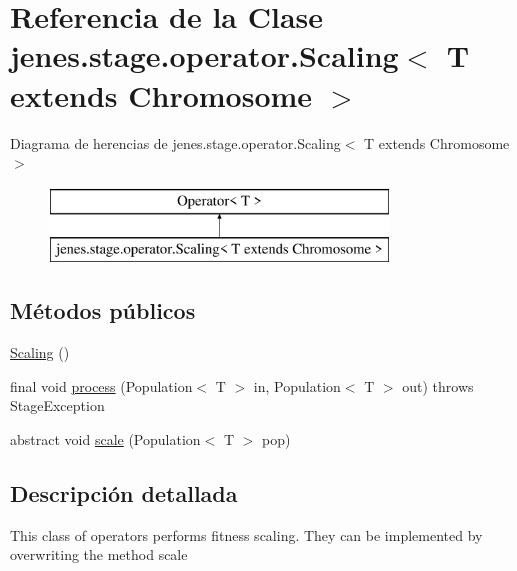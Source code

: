 \hypertarget{classjenes_1_1stage_1_1operator_1_1_scaling_3_01_t_01extends_01_chromosome_01_4}{\section{Referencia de la Clase jenes.\-stage.\-operator.\-Scaling$<$ T extends Chromosome $>$}
\label{classjenes_1_1stage_1_1operator_1_1_scaling_3_01_t_01extends_01_chromosome_01_4}
}
Diagrama de herencias de jenes.\-stage.\-operator.\-Scaling$<$ T extends Chromosome $>$\begin{figure}[H]
\begin{center}
\leavevmode
\includegraphics[height=2.000000cm]{classjenes_1_1stage_1_1operator_1_1_scaling_3_01_t_01extends_01_chromosome_01_4}
\end{center}
\end{figure}
\subsection*{Métodos públicos}
\begin{DoxyCompactItemize}
\item 
\hyperlink{classjenes_1_1stage_1_1operator_1_1_scaling_3_01_t_01extends_01_chromosome_01_4_a04089dfb0f712c85ca27fdbab69a5b9e}{Scaling} ()
\item 
final void \hyperlink{classjenes_1_1stage_1_1operator_1_1_scaling_3_01_t_01extends_01_chromosome_01_4_a1577b3956323b5110e4c740ccaaa5905}{process} (Population$<$ T $>$ in, Population$<$ T $>$ out)  throws Stage\-Exception 
\item 
abstract void \hyperlink{classjenes_1_1stage_1_1operator_1_1_scaling_3_01_t_01extends_01_chromosome_01_4_ae72d4b2ab8bd3504471ce67788c841cd}{scale} (Population$<$ T $>$ pop)
\end{DoxyCompactItemize}


\subsection{Descripción detallada}
This class of operators performs fitness scaling. They can be implemented by overwriting the method {\ttfamily scale}

